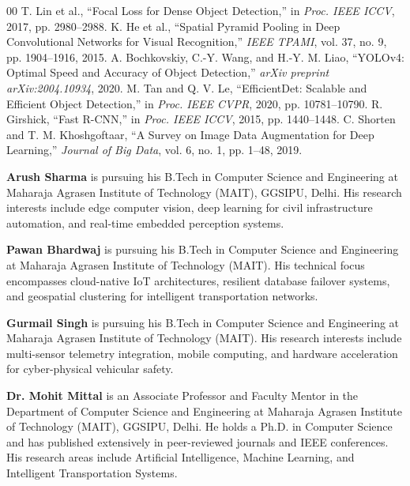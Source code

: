 \documentclass[conference]{IEEEtran}
\begin{document}
\begin{thebibliography}{00}
 T. Lin et al., ``Focal Loss for Dense Object Detection,'' in \textit{Proc. IEEE ICCV}, 2017, pp. 2980--2988.
 K. He et al., ``Spatial Pyramid Pooling in Deep Convolutional Networks for Visual Recognition,'' \textit{IEEE TPAMI}, vol. 37, no. 9, pp. 1904--1916, 2015.
 A. Bochkovskiy, C.-Y. Wang, and H.-Y. M. Liao, ``YOLOv4: Optimal Speed and Accuracy of Object Detection,'' \textit{arXiv preprint arXiv:2004.10934}, 2020.
 M. Tan and Q. V. Le, ``EfficientDet: Scalable and Efficient Object Detection,'' in \textit{Proc. IEEE CVPR}, 2020, pp. 10781--10790.
 R. Girshick, ``Fast R-CNN,'' in \textit{Proc. IEEE ICCV}, 2015, pp. 1440--1448.
 C. Shorten and T. M. Khoshgoftaar, ``A Survey on Image Data Augmentation for Deep Learning,'' \textit{Journal of Big Data}, vol. 6, no. 1, pp. 1--48, 2019.
\end{thebibliography}

\vspace{12pt}
\noindent\textbf{Arush Sharma} is pursuing his B.Tech in Computer Science and Engineering at Maharaja Agrasen Institute of Technology (MAIT), GGSIPU, Delhi. His research interests include edge computer vision, deep learning for civil infrastructure automation, and real-time embedded perception systems.

\vspace{8pt}
\noindent\textbf{Pawan Bhardwaj} is pursuing his B.Tech in Computer Science and Engineering at Maharaja Agrasen Institute of Technology (MAIT). His technical focus encompasses cloud-native IoT architectures, resilient database failover systems, and geospatial clustering for intelligent transportation networks.

\vspace{8pt}
\noindent\textbf{Gurmail Singh} is pursuing his B.Tech in Computer Science and Engineering at Maharaja Agrasen Institute of Technology (MAIT). His research interests include multi-sensor telemetry integration, mobile computing, and hardware acceleration for cyber-physical vehicular safety.

\vspace{8pt}
\noindent\textbf{Dr. Mohit Mittal} is an Associate Professor and Faculty Mentor in the Department of Computer Science and Engineering at Maharaja Agrasen Institute of Technology (MAIT), GGSIPU, Delhi. He holds a Ph.D. in Computer Science and has published extensively in peer-reviewed journals and IEEE conferences. His research areas include Artificial Intelligence, Machine Learning, and Intelligent Transportation Systems.
\end{document}
